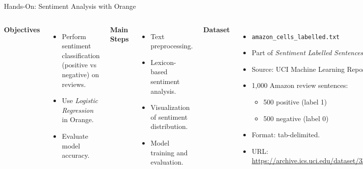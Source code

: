 \documentclass[aspectratio=169, table]{beamer}
\begin{document}
\begin{frame}{Hands-On: Sentiment Analysis with Orange}
	\vspace{15pt}
	\begin{columns}[T,totalwidth=\textwidth]
		\textbf{Objectives}
		\begin{itemize}
			\item Perform sentiment classification (positive vs negative) on reviews.
			\item Use \textit{Logistic Regression} in Orange.
			\item Evaluate model accuracy.
		\end{itemize}
		
		\vspace{0.5em}
		\textbf{Main Steps}
		\begin{itemize}
			\item Text preprocessing.
			\item Lexicon-based sentiment analysis.
			\item Visualization of sentiment distribution.
			\item Model training and evaluation.
		\end{itemize}
		
		\textbf{Dataset}
		\begin{itemize}
			\item \texttt{amazon\_cells\_labelled.txt}
			\item Part of \textit{Sentiment Labelled Sentences}.
			\item Source: UCI Machine Learning Repository.
			\item 1,000 Amazon review sentences:
			\begin{itemize}
				\item 500 positive (label 1)
				\item 500 negative (label 0)
			\end{itemize}
			\item Format: tab-delimited.
			\item URL: \url{https://archive.ics.uci.edu/dataset/331/sentiment+labelled+sentences}
		\end{itemize}
	\end{columns}
\end{frame}
\end{document}
